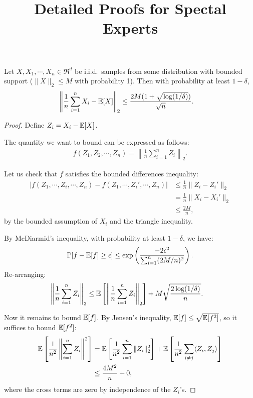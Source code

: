\documentclass[tablecaption=bottom]{jmlr}
\title{Detailed Proofs for Spectal Experts}
\author{\Name{Arun Tejasvi Chaganty} \Email{chaganty@stanford.edu}}
\begin{document}
\maketitle

\begin{lemma}
  \label{lem:conc-norms}
  Let $X, X_1, \cdots, X_n \in \Re^d$ be i.i.d.\ samples
  from some distribution with bounded support
  ($\|X\|_2 \le M$ with probability 1).
  Then with probability at least $1 - \delta$,
  \begin{align}
    \left\| \frac{1}{n} \sum_{i=1}^{n} X_i - \operatorname{\mathbb{E}}[X] \right\|_2 &
    \le \frac{2 M (1 + \sqrt{\log(1/\delta)})}{\sqrt{n}}.
  \end{align}
\end{lemma}
\begin{proof}
  Define $Z_i = X_i - \operatorname{\mathbb{E}}[X]$.


The quantity we want to bound can be expressed as follows:
  \begin{align}
  f(Z_1, Z_2, \cdots, Z_n) = \left\| \frac1n \sum_{i=1}^n Z_i \right\|_2.
  \end{align}

Let us check that $f$ satisfies the bounded differences inequality:
  \begin{align}
|f(Z_1, \cdots, Z_i, \cdots, Z_n) - f(Z_1, \cdots, Z_i', \cdots, Z_n)|
& \le \frac1n \|Z_i - Z_i'\|_2 \\
& = \frac1n \|X_i - X_i'\|_2 \\
&\le \frac{2M}{n},
  \end{align}
  by the bounded assumption of $X_i$ and the triangle inequality.

By McDiarmid's inequality,
with probability at least $1 - \delta$,
we have:
\begin{align}
\mathbb{P}[f - \operatorname{\mathbb{E}}[f] \ge \epsilon] \le
\exp\left(\frac{-2 \epsilon^2}{\sum_{i=1}^n (2M/n)^2}\right).
\end{align}
Re-arranging:
\begin{align}
  \left\|\frac{1}{n}\sum_{i=1}^n Z_i\right\|_2
  &\le \operatorname{\mathbb{E}}\left[ \left\| \frac{1}{n} \sum_{i=1}^n Z_i \right\|_2 \right]
  + M\sqrt{\frac{2\log(1/\delta)}{n}}.
\end{align}

Now it remains to bound $\operatorname{\mathbb{E}}[f]$.
By Jensen's inequality, $\operatorname{\mathbb{E}}[f] \le \sqrt{\operatorname{\mathbb{E}}[f^2]}$,
so it suffices to bound $\operatorname{\mathbb{E}}[f^2]$:
\begin{align}
  \operatorname{\mathbb{E}}\left[ \frac1{n^2} \left\| \sum_{i=1}^n Z_i \right\|^2 \right]
  &= \operatorname{\mathbb{E}}\left[ \frac1{n^2} \sum_{i=1}^n \|Z_i\|_2^2 \right] +
\operatorname{\mathbb{E}}\left[ \frac1{n^2} \sum_{i\neq j} \langle Z_i, Z_j \rangle \right] \\ 
& \le \frac{4M^2}{n} + 0,
\end{align}
where the cross terms are zero by independence of the $Z_i$'s.


\end{proof}
\end{document}
